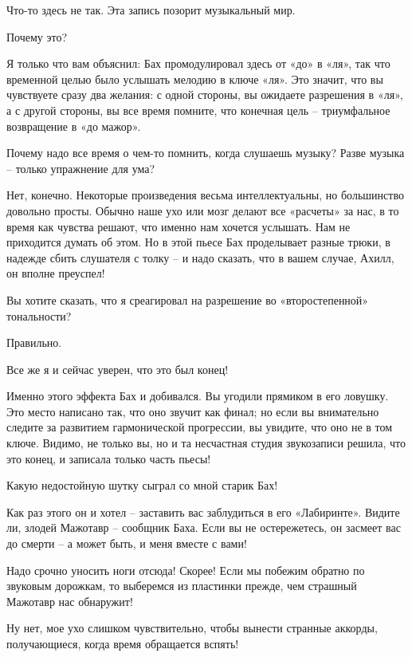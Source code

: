 \documentclass[../main.tex]{subfiles}
\begin{document}
\begin{Dialogue}
\begin{sublevel}
\begin{sublevel}
\begin{sublevel}
 Что-то здесь не так. Эта запись позорит музыкальный мир.

 Почему это?

 Я только что вам объяснил: Бах промодулировал здесь от «до» в «ля», так что временной целью было услышать мелодию в ключе «ля». Это значит, что вы чувствуете сразу два желания: с одной стороны, вы ожидаете разрешения в «ля», а с другой стороны, вы все время помните, что конечная цель \--- триумфальное возвращение в «до мажор».

 Почему надо все время о чем-то помнить, когда слушаешь музыку? Разве музыка \--- только упражнение для ума?

 Нет, конечно. Некоторые произведения весьма интеллектуальны, но большинство довольно просты. Обычно наше ухо или мозг делают все «расчеты» за нас, в то время как чувства решают, что именно нам хочется услышать. Нам не приходится думать об этом. Но в этой пьесе Бах проделывает разные трюки, в надежде сбить слушателя с толку \--- и надо сказать, что в вашем случае, Ахилл, он вполне преуспел!

 Вы хотите сказать, что я среагировал на разрешение во «второстепенной» тональности?

 Правильно.

 Все же я и сейчас уверен, что это был конец!

 Именно этого эффекта Бах и добивался. Вы угодили прямиком в его ловушку. Это место написано так, что оно звучит как финал; но если вы внимательно следите за развитием гармонической прогрессии, вы увидите, что оно не в том ключе. Видимо, не только вы, но и та несчастная студия звукозаписи решила, что это конец, и записала только часть пьесы!

 Какую недостойную шутку сыграл со мной старик Бах!

 Как раз этого он и хотел \--- заставить вас заблудиться в его «Лабиринте». Видите ли, злодей Мажотавр \--- сообщник Баха. Если вы не остережетесь, он засмеет вас до смерти \--- а может быть, и меня вместе с вами!

 Надо срочно уносить ноги отсюда! Скорее! Если мы побежим обратно по звуковым дорожкам, то выберемся из пластинки прежде, чем страшный Мажотавр нас обнаружит!

 Ну нет, мое ухо слишком чувствительно, чтобы вынести странные аккорды, получающиеся, когда время обращается вспять!


\end{sublevel}
\end{sublevel}
\end{sublevel}
\end{Dialogue}
\end{document}
